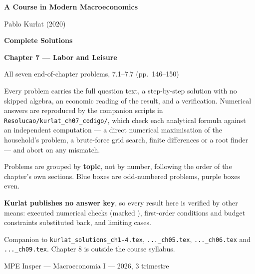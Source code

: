 \documentclass[12pt, letterpaper]{article}
\begin{document}
\begin{titlepage}
\centering
\vspace*{2.5cm}
{\Huge\bfseries\color{darkblue} A Course in Modern Macroeconomics\par}
\vspace{6pt}
{\large Pablo Kurlat (2020)\par}
\vspace{1.4cm}
{\LARGE\bfseries Complete Solutions\par}
\vspace{6pt}
{\LARGE\bfseries Chapter 7 --- Labor and Leisure\par}
\vspace{1.2cm}
{\large All seven end-of-chapter problems, 7.1--7.7 (pp.~146--150)\par}
\vspace{2cm}

\begin{tcolorbox}[theorybox,title={What is in this file},width=0.86\textwidth]
\small
Every problem carries the full question text, a step-by-step solution with no skipped
algebra, an economic reading of the result, and a verification. Numerical answers are
reproduced by the companion scripts in \texttt{Resolucao/kurlat\_ch07\_codigo/}, which
check each analytical formula against an independent computation --- a direct numerical
maximisation of the household's problem, a brute-force grid search, finite differences or a
root finder --- and abort on any mismatch.

\smallskip
Problems are grouped by \textbf{topic}, not by number, following the order of the
chapter's own sections. Blue boxes are odd-numbered problems, purple boxes even.

\smallskip
\textbf{Kurlat publishes no answer key}, so every result here is verified by other means:
executed numerical checks (marked \checkmark), first-order conditions and budget constraints
substituted back, and limiting cases.

\smallskip
Companion to \texttt{kurlat\_solutions\_ch1-4.tex}, \texttt{...\_ch05.tex},
\texttt{...\_ch06.tex} and \texttt{...\_ch09.tex}. Chapter 8 is outside the course syllabus.
\end{tcolorbox}

\vfill
{\small MPE Insper --- Macroeconomia I --- 2026, 3\textordmasculine{} trimestre\par}
\end{titlepage}
\end{document}
